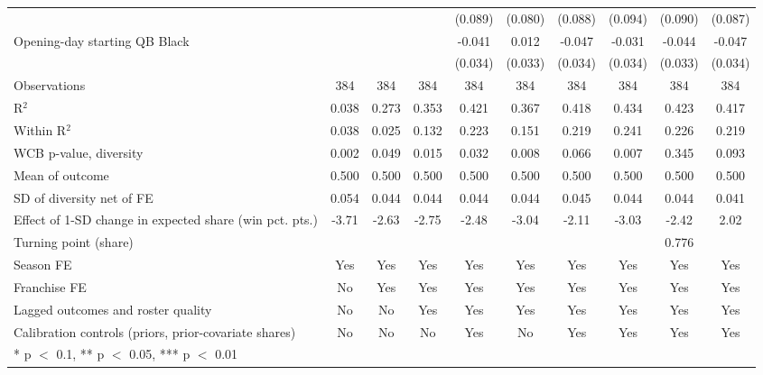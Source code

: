 \begin{table}[H]
{\begin{tabular}[t]{lccccccccc}
 &  &  &  & (0.089) & (0.080) & (0.088) & (0.094) & (0.090) & (0.087)\\
Opening-day starting QB Black &  &  &  & -0.041 & 0.012 & -0.047 & -0.031 & -0.044 & -0.047\\
 &  &  &  & (0.034) & (0.033) & (0.034) & (0.034) & (0.033) & (0.034)\\
\midrule
Observations & 384 & 384 & 384 & 384 & 384 & 384 & 384 & 384 & 384\\
R$^2$ & 0.038 & 0.273 & 0.353 & 0.421 & 0.367 & 0.418 & 0.434 & 0.423 & 0.417\\
Within R$^2$ & 0.038 & 0.025 & 0.132 & 0.223 & 0.151 & 0.219 & 0.241 & 0.226 & 0.219\\
WCB p-value, diversity & 0.002 & 0.049 & 0.015 & 0.032 & 0.008 & 0.066 & 0.007 & 0.345 & 0.093\\
Mean of outcome & 0.500 & 0.500 & 0.500 & 0.500 & 0.500 & 0.500 & 0.500 & 0.500 & 0.500\\
SD of diversity net of FE & 0.054 & 0.044 & 0.044 & 0.044 & 0.044 & 0.045 & 0.044 & 0.044 & 0.041\\
Effect of 1-SD change in expected share (win pct. pts.) & -3.71 & -2.63 & -2.75 & -2.48 & -3.04 & -2.11 & -3.03 & -2.42 & 2.02\\
Turning point (share) &  &  &  &  &  &  &  & 0.776 & \\
Season FE & Yes & Yes & Yes & Yes & Yes & Yes & Yes & Yes & Yes\\
Franchise FE & No & Yes & Yes & Yes & Yes & Yes & Yes & Yes & Yes\\
Lagged outcomes and roster quality & No & No & Yes & Yes & Yes & Yes & Yes & Yes & Yes\\
Calibration controls (priors, prior-covariate shares) & No & No & No & Yes & No & Yes & Yes & Yes & Yes\\
\bottomrule
\multicolumn{10}{l}{\rule{0pt}{1em}* p $<$ 0.1, ** p $<$ 0.05, *** p $<$ 0.01}\\
\end{tabular}}
\end{table}

